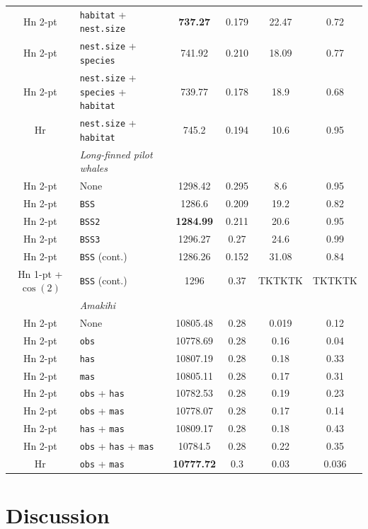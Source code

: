 \documentclass[useAMS,referee, usegraphicx]{biom}
\begin{document}
\begin{table}
\begin{tabular}{c l c c c c}
Hn 2-pt & \texttt{habitat} + \texttt{nest.size} & \textbf{737.27} & 0.179 & 22.47 & 0.72\\
Hn 2-pt & \texttt{nest.size} + \texttt{species} & 741.92 & 0.210 & 18.09 & 0.77\\
Hn 2-pt & \texttt{nest.size} + \texttt{species} + \texttt{habitat} & 739.77 & 0.178 & 18.9 & 0.68 \\
Hr & \texttt{nest.size} + \texttt{habitat} & 745.2 & 0.194 & 10.6 & 0.95\\
 &  \textit{Long-finned pilot whales} & & & & \\
Hn 2-pt & None & 1298.42 & 0.295 & 8.6 & 0.95 \\
Hn 2-pt & \texttt{BSS} & 1286.6 & 0.209 & 19.2 & 0.82 \\
Hn 2-pt & \texttt{BSS2} & \textbf{1284.99} & 0.211 & 20.6 & 0.95\\
Hn 2-pt & \texttt{BSS3} & 1296.27 & 0.27 & 24.6 & 0.99 \\
Hn 2-pt & \texttt{BSS} (cont.) &  1286.26 & 0.152 & 31.08 & 0.84\\
Hn 1-pt + $\cos(2)$& \texttt{BSS} (cont.) & 1296 & 0.37 &TKTKTK &TKTKTK \\
 &  \textit{Amakihi} & & & & \\
Hn 2-pt & None & 10805.48 & 0.28 & 0.019 & 0.12 \\
Hn 2-pt & \texttt{obs} & 10778.69 & 0.28 & 0.16 & 0.04\\
Hn 2-pt & \texttt{has} & 10807.19 &  0.28 & 0.18 & 0.33\\
Hn 2-pt & \texttt{mas} & 10805.11 &  0.28 & 0.17 & 0.31\\
Hn 2-pt & \texttt{obs} + \texttt{has} & 10782.53 & 0.28 & 0.19 & 0.23\\
Hn 2-pt & \texttt{obs} + \texttt{mas} & 10778.07 & 0.28 & 0.17 & 0.14\\
Hn 2-pt & \texttt{has} + \texttt{mas} & 10809.17 & 0.28 & 0.18 & 0.43 \\
Hn 2-pt & \texttt{obs} + \texttt{has} + \texttt{mas} & 10784.5 & 0.28 & 0.22 & 0.35\\
Hr & \texttt{obs} + \texttt{mas} & \textbf{10777.72} & 0.3 & 0.03 & 0.036 \\
\hline
\hline
\end{tabular}
\label{pilot-table}
\end{table}


\section{Discussion}
\label{s:discuss}
\end{document}
